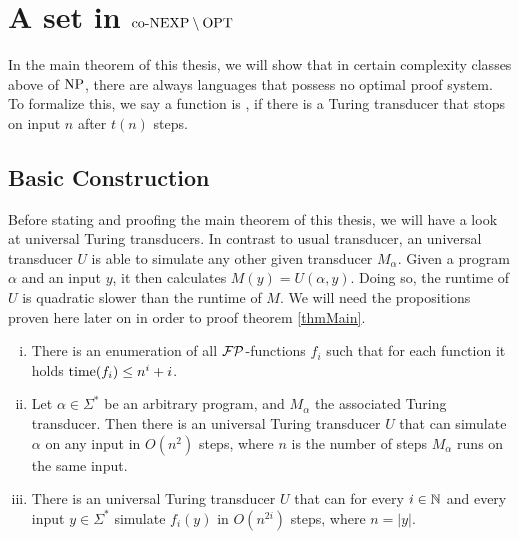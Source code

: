 \chapter{A set in $\text{co-NEXP} \setminus \text{OPT}$} \label{chpConexpMinusOpt}
  In the main theorem of this thesis, we will show that in certain complexity classes above of \(\text{NP}\), there are always languages that possess no optimal proof system. To formalize this, we say a function is , if there is a Turing transducer that stops on input \(n\) after \(t(n)\) steps.

  \section{Basic Construction}
  
  Before stating and proofing the main theorem of this thesis, we will have a look at universal Turing transducers. In contrast to usual transducer, an universal transducer \(U\) is able to simulate any other given transducer \(M_\alpha\). Given a program \(\alpha\) and an input \(y\), it then calculates \(M(y) = U(\alpha, y)\). Doing so, the runtime of \(U\) is quadratic slower than the runtime of \(M\). We will need the propositions proven here later on in order to proof theorem \ref{thmMain}.
  
  \begin{lemma}\label{lemSimulation}
    \begin{enumerate}[(i)]
     \item There is an enumeration of all \(\mathcal{FP}\)-functions \(f_i\) such that for each function it holds \(\operatorname{time}(f_i) \leq n^i + i\).
     \item Let \(\alpha \in \Sigma^*\) be an arbitrary program, and \(M_\alpha\) the associated Turing transducer. Then there is an universal Turing transducer \(U\) that can simulate \(\alpha\) on any input in \(O(n^2)\) steps, where \(n\) is the number of steps \(M_\alpha\) runs on the same input.
     \item There is an universal Turing transducer \(U\) that can for every \(i \in \mathbb{N}\) and every input \(y \in \Sigma^*\) simulate \(f_i(y)\) in \(O(n^{2i})\) steps, where \(n = |y|\).
    \end{enumerate}
  \end{lemma}
  
